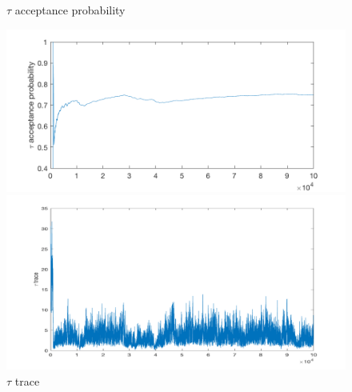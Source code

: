 \documentclass{siamart1116}
\begin{document}
\begin{figure}[!htb]
    \begin{minipage}{0.48\textwidth}
        \centering
        \caption{\label{fig:hier_sim_3} $\tau$ acceptance probability}
        \includegraphics[width=\linewidth]{graphics/noncentered/acceptance_tau_probability.png}
    \end{minipage} \hfill
    \begin{minipage}{0.48\textwidth}
        \centering
        \caption{\label{fig:hier_sim_4}  $\tau$ trace}
        \includegraphics[width=\linewidth]{graphics/noncentered/trace_tau.png}
    \end{minipage}
\end{figure}
\end{document}
